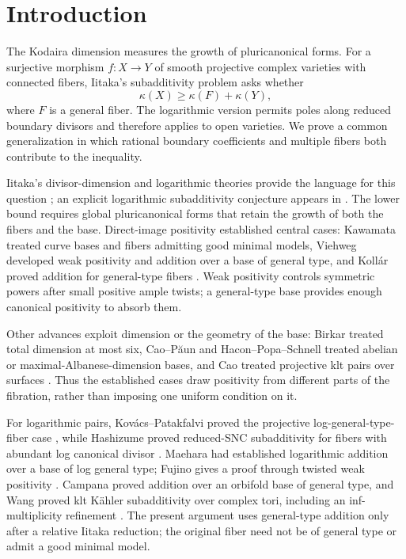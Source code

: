 \section{Introduction}\label{intro:section}

The Kodaira dimension measures the growth of pluricanonical forms.
For a surjective morphism $f:X\to Y$ of smooth projective complex varieties
with connected fibers, Iitaka's subadditivity problem asks whether
\[
                  \kappa(X)\geq\kappa(F)+\kappa(Y),
\]
where $F$ is a general fiber. The logarithmic version permits poles
along reduced boundary divisors and therefore applies to open
varieties. We prove a common generalization in which rational boundary
coefficients and multiple fibers both contribute to the inequality.

Iitaka's divisor-dimension and logarithmic theories provide the
language for this question \cite{IitakaOriginal,IitakaLog}; an
explicit logarithmic subadditivity conjecture appears in
\cite[\S3]{IitakaClassification}.
The lower bound requires global pluricanonical forms that retain
the growth of both the fibers and the base. Direct-image positivity
established central cases: Kawamata treated curve bases and fibers
admitting good minimal models, Viehweg developed weak positivity
and addition over a base of general type, and Koll\'ar proved
addition for general-type fibers
\cite{KawamataCurves,KawamataKodaira,ViehwegAdditivity,Kollar87}.
Weak positivity controls symmetric powers after small positive
ample twists; a general-type base provides enough canonical
positivity to absorb them.

Other advances exploit dimension or the geometry of the base:
Birkar treated total dimension at most six, Cao--P\u{a}un and
Hacon--Popa--Schnell treated abelian or maximal-Albanese-dimension
bases, and Cao treated projective klt pairs over surfaces
\cite{BirkarIitakaSix,CaoPaunAbelian,HaconPopaSchnellAbelian,CaoSurfaces}.
Thus the established cases draw positivity from different parts of
the fibration, rather than imposing one uniform condition on it.

For logarithmic pairs, Kov\'acs--Patakfalvi proved the projective
log-general-type-fiber case \cite[Theorem~9.6]{KovacsPatakfalvi},
while Hashizume proved reduced-SNC subadditivity for fibers with
abundant log canonical divisor \cite[Theorem~1.2]{Hashizume}.
Maehara had established logarithmic addition over a base of log
general type; Fujino gives a proof through twisted weak positivity
\cite[Theorem~1.9]{FujinoWeakPositivity}.
Campana proved addition over an orbifold base of general type, and
Wang proved klt K\"ahler subadditivity over complex tori, including
an inf-multiplicity refinement
\cite[Theorem~6.3]{CampanaOrbifolds}
\cite[Main Theorem~A and Theorem~E]{WangKahlerIitaka}.
The present argument uses general-type addition only after a relative
Iitaka reduction; the original fiber need not be of general type
or admit a good minimal model.


